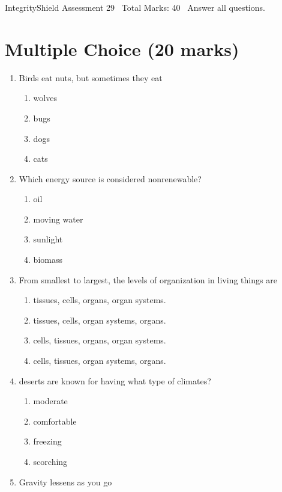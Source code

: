 \documentclass[12pt]{article}
\begin{document}
\begin{center}
IntegrityShield Assessment 29 \
Total Marks: 40 \
Answer all questions.
\end{center}

\section*{Multiple Choice (20 marks)}
\begin{enumerate}[label=\arabic*.]
\item Birds eat nuts, but sometimes they eat
\begin{enumerate}[label=(\alph*)]
    \item wolves
    \item bugs
    \item dogs
    \item cats
\end{enumerate}
\item Which energy source is considered nonrenewable?
\begin{enumerate}[label=(\alph*)]
    \item oil
    \item moving water
    \item sunlight
    \item biomass
\end{enumerate}
\item From smallest to largest, the levels of organization in living things are
\begin{enumerate}[label=(\alph*)]
    \item tissues, cells, organs, organ systems.
    \item tissues, cells, organ systems, organs.
    \item cells, tissues, organs, organ systems.
    \item cells, tissues, organ systems, organs.
\end{enumerate}
\item deserts are known for having what type of climates?
\begin{enumerate}[label=(\alph*)]
    \item moderate
    \item comfortable
    \item freezing
    \item scorching
\end{enumerate}
\item Gravity lessens as you go
\begin{enumerate}[label=(\alph*)]

\end{enumerate}
\end{enumerate}
\end{document}

